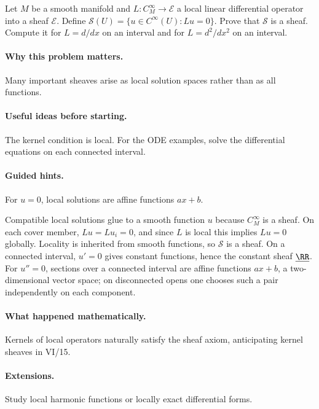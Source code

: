 \begin{problem}
Let $M$ be a smooth manifold and $L:C^\infty_M\to\mathcal E$ a local linear differential operator into a sheaf $\mathcal E$. Define $\mathcal S(U)=\{u\in C^\infty(U):Lu=0\}$. Prove that $\mathcal S$ is a sheaf. Compute it for $L=d/dx$ on an interval and for $L=d^2/dx^2$ on an interval.
\end{problem}

\paragraph{Why this problem matters.}
Many important sheaves arise as local solution spaces rather than as all functions.

\paragraph{Useful ideas before starting.}
The kernel condition is local. For the ODE examples, solve the differential equations on each connected interval.

\paragraph{Guided hints.}
For $u=0$, local solutions are affine functions $ax+b$.

\ifdefined\FullProblemDossiers
\begin{solution}
Compatible local solutions glue to a smooth function $u$ because $C^\infty_M$ is a sheaf. On each cover member, $Lu=Lu_i=0$, and since $L$ is local this implies $Lu=0$ globally. Locality is inherited from smooth functions, so $\mathcal S$ is a sheaf. On a connected interval, $u'=0$ gives constant functions, hence the constant sheaf $\underline\RR$. For $u''=0$, sections over a connected interval are affine functions $ax+b$, a two-dimensional vector space; on disconnected opens one chooses such a pair independently on each component.
\end{solution}

\paragraph{What happened mathematically.}
Kernels of local operators naturally satisfy the sheaf axiom, anticipating kernel sheaves in VI/15.

\paragraph{Extensions.}
Study local harmonic functions or locally exact differential forms.
\fi
